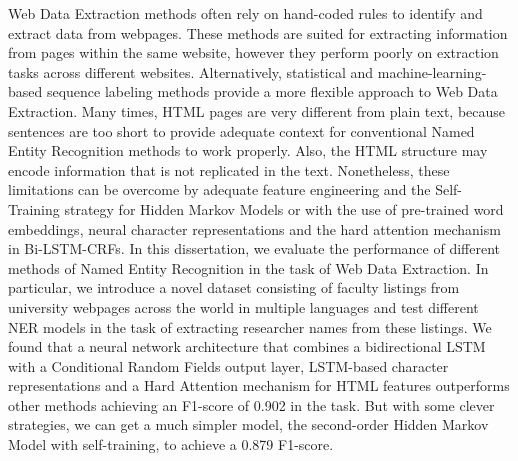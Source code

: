 Web Data Extraction methods often rely on hand-coded rules to 
identify and extract data from webpages. These methods are
suited for extracting information from pages within
the same website, however they perform poorly on extraction 
tasks across different websites. Alternatively, statistical and 
machine-learning-based sequence labeling methods provide a more flexible 
approach to Web Data Extraction. Many times, HTML pages are very different 
from plain text, because sentences are too short to provide adequate 
context for conventional Named Entity Recognition methods to work 
properly. Also, the HTML structure may encode information that is not 
replicated in the text. Nonetheless, these limitations can be overcome by
adequate feature engineering and the Self-Training strategy for Hidden
Markov Models or with the use of pre-trained word embeddings, neural character 
representations and the hard attention mechanism in Bi-LSTM-CRFs.
In this dissertation, we 
evaluate the performance of different methods of Named Entity Recognition 
in the task of Web Data Extraction. In particular, we introduce a novel 
dataset consisting of faculty listings from university webpages across
the world in multiple languages and test different NER models in the task of 
extracting researcher names from these listings. We found that a 
neural network architecture that combines a bidirectional LSTM with
a Conditional Random Fields output layer, LSTM-based character 
representations and a Hard Attention mechanism for HTML features
outperforms other methods achieving an F1-score of 0.902 in the task.
But with some clever strategies, we can get a much simpler model, the 
second-order Hidden Markov Model with self-training, to achieve a 0.879 
F1-score.


